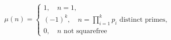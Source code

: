 \documentclass[english]{article}
\theoremstyle{definition}
\begin{document}
\begin{align*}
    \mu(n) = \begin{cases}
        1, \quad n = 1, \\
        (-1)^k, \quad n = \prod_{i = 1}^k p_i \text{ distinct primes}, \\
        0, \quad n \text{ not squarefree}
    \end{cases}
\end{align*}
\end{document}
